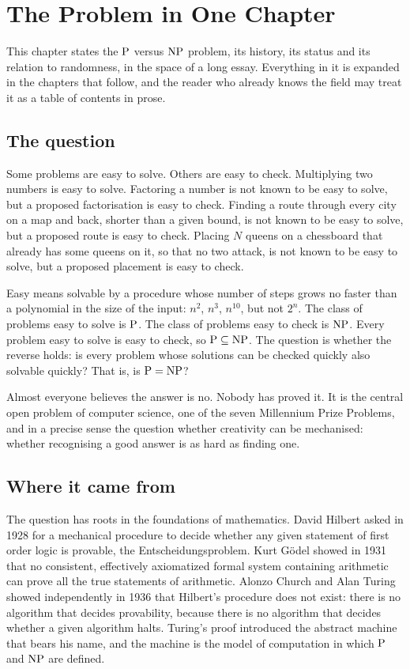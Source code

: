 \chapter{The Problem in One Chapter}
\label{ch:summary}

This chapter states the $\mathrm{P}$ versus $\mathrm{NP}$ problem, its history, its status and its relation to randomness, in the space of a long essay. Everything in it is expanded in the chapters that follow, and the reader who already knows the field may treat it as a table of contents in prose.

\section{The question}

Some problems are easy to solve. Others are easy to check. Multiplying two numbers is easy to solve. Factoring a number is not known to be easy to solve, but a proposed factorisation is easy to check. Finding a route through every city on a map and back, shorter than a given bound, is not known to be easy to solve, but a proposed route is easy to check. Placing $N$ queens on a chessboard that already has some queens on it, so that no two attack, is not known to be easy to solve, but a proposed placement is easy to check.

Easy means solvable by a procedure whose number of steps grows no faster than a polynomial in the size of the input: $n^2$, $n^3$, $n^{10}$, but not $2^n$. The class of problems easy to solve is $\mathrm{P}$. The class of problems easy to check is $\mathrm{NP}$. Every problem easy to solve is easy to check, so $\mathrm{P} \subseteq \mathrm{NP}$. The question is whether the reverse holds: is every problem whose solutions can be checked quickly also solvable quickly? That is, is $\mathrm{P} = \mathrm{NP}$?

Almost everyone believes the answer is no. Nobody has proved it. It is the central open problem of computer science, one of the seven Millennium Prize Problems, and in a precise sense the question whether creativity can be mechanised: whether recognising a good answer is as hard as finding one.

\section{Where it came from}

The question has roots in the foundations of mathematics. David Hilbert asked in 1928 for a mechanical procedure to decide whether any given statement of first order logic is provable, the Entscheidungsproblem. Kurt G\"odel showed in 1931 that no consistent, effectively axiomatized formal system containing arithmetic can prove all the true statements of arithmetic. Alonzo Church and Alan Turing showed independently in 1936 that Hilbert's procedure does not exist: there is no algorithm that decides provability, because there is no algorithm that decides whether a given algorithm halts. Turing's proof introduced the abstract machine that bears his name, and the machine is the model of computation in which $\mathrm{P}$ and $\mathrm{NP}$ are defined.

